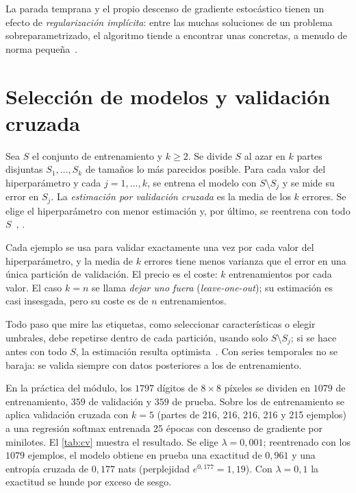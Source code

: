 La parada temprana y el propio descenso de gradiente estocástico tienen un efecto de \emph{regularización implícita}: entre las muchas soluciones de un problema sobreparametrizado, el algoritmo tiende a encontrar unas concretas, a menudo de norma pequeña~\cite[§9.2]{cs229}.

\section{Selección de modelos y validación cruzada}

\begin{definicion}\label{def:kfold}
Sea $S$ el conjunto de entrenamiento y $k\ge 2$. Se divide $S$ al azar en $k$ partes disjuntas $S_1,\dots,S_k$ de tamaños lo más parecidos posible. Para cada valor del hiperparámetro y cada $j=1,\dots,k$, se entrena el modelo con $S\setminus S_j$ y se mide su error en $S_j$. La \emph{estimación por validación cruzada} es la media de los $k$ errores. Se elige el hiperparámetro con menor estimación y, por último, se reentrena con todo $S$~\cite[§9.3]{cs229}, \cite[§7.10.1]{esl}.
\end{definicion}

Cada ejemplo se usa para validar exactamente una vez por cada valor del hiperparámetro, y la media de $k$ errores tiene menos varianza que el error en una única partición de validación. El precio es el coste: $k$ entrenamientos por cada valor. El caso $k=n$ se llama \emph{dejar uno fuera} (\emph{leave-one-out}); su estimación es casi insesgada, pero su coste es de $n$ entrenamientos.

\begin{observacion}
Todo paso que mire las etiquetas, como seleccionar características o elegir umbrales, debe repetirse dentro de cada partición, usando solo $S\setminus S_j$; si se hace antes con todo $S$, la estimación resulta optimista~\cite[§7.10.2]{esl}. Con series temporales no se baraja: se valida siempre con datos posteriores a los de entrenamiento.
\end{observacion}

\begin{ejemplo}\label{ej:cv-digitos}
En la práctica del módulo, los $1797$ dígitos de $8\times 8$ píxeles se dividen en $1079$ de entrenamiento, $359$ de validación y $359$ de prueba. Sobre los de entrenamiento se aplica validación cruzada con $k=5$ (partes de 216, 216, 216, 216 y 215 ejemplos) a una regresión softmax entrenada 25 épocas con descenso de gradiente por minilotes. El \cref{tab:cv} muestra el resultado. Se elige $\lambda=0{,}001$; reentrenado con los $1079$ ejemplos, el modelo obtiene en prueba una exactitud de $0{,}961$ y una entropía cruzada de $0{,}177$ nats (perplejidad $e^{0{,}177}=1{,}19$). Con $\lambda=0{,}1$ la exactitud se hunde por exceso de sesgo.
\end{ejemplo}

